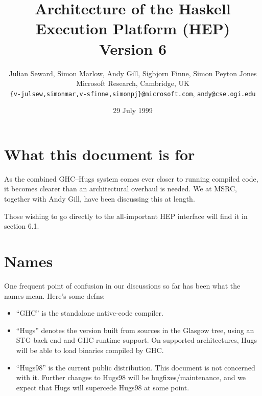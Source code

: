 \newcommand{\ToDo}[1]{{{\bf ToDo:} \sl #1}}

\newenvironment{outline}{%
  \medbreak
  \noindent
  {\bf Outline: }
  \begingroup
    \nobreak
    \sl
}{%
  \endgroup
  \nobreak
  {\bf End outline.}
  \medbreak
}

%



\title{%
  Architecture of the Haskell Execution Platform (HEP)\\
  Version 6
}

\author{Julian Seward, Simon Marlow, Andy Gill, Sigbjorn Finne, Simon
  Peyton Jones \\
Microsoft Research, Cambridge, UK\\
{\tt \{v-julsew,simonmar,v-sfinne,simonpj\}@microsoft.com}, {\tt andy@cse.ogi.edu}}
\date{29 July 1999}
\maketitle



\section{What this document is for}
As the combined GHC--Hugs system comes ever closer to running compiled
code, it becomes clearer than an architectural overhaul is
needed.  We at MSRC, together with Andy Gill, have been discussing
this at length.

Those wishing to go directly to the all-important HEP
interface will find it in section 6.1.

\section{Names}
One frequent point of confusion in our discussions so far has
been what the names mean.  Here's some defns:

\begin{itemize}
\item ``GHC'' is the standalone native-code compiler.
\item ``Hugs''
  denotes the version built from sources in the Glasgow tree,
  using an STG back end and GHC runtime support.  On supported
  architectures, Hugs will be able to load binaries compiled by GHC.
\item ``Hugs98'' is the current public distribution.  This document is not
  concerned with it.  Further changes to
  Hugs98 will be bugfixes/maintenance, and we expect that Hugs will
  supercede Hugs98 at some point.
\end{itemize}


